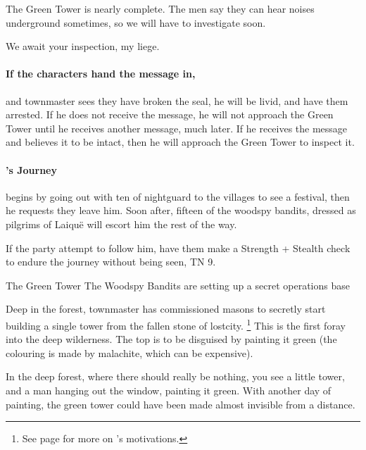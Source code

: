 \begin{multicols}{2}
\begin{speechtext}
	The Green Tower is nearly complete.
	The men say they can hear noises underground sometimes, so we will have to investigate soon.

	We await your inspection, my liege.

\end{speechtext}

\paragraph{If the characters hand the message in,}
and \gls{townmaster} sees they have broken the seal, he will be livid, and have them arrested.
If he does not receive the message, he will not approach the Green Tower until he receives another message, much later.
If he receives the message and believes it to be intact, then he will approach the Green Tower to inspect it.

\paragraph{'s Journey}
begins by going out with ten of \gls{nightguard} to the villages to see a festival, then he requests they leave him.
Soon after, fifteen of the woodspy bandits, dressed as pilgrims of Laiqu\"e will escort him the rest of the way.

If the party attempt to follow him, have them make a Strength + Stealth check to endure the journey without being seen, TN 9.


{The Green Tower}%
{The Woodspy Bandits are setting up a secret operations base}%

Deep in the forest, \gls{townmaster} has commissioned masons to secretly start building a single tower from the fallen stone of \gls{lostcity}.
\footnote{See page \pageref{expanding_wilderness} for more on 's motivations.}
This is the first foray into the deep wilderness.
The top is to be disguised by painting it green (the colouring is made by malachite, which can be expensive).

\begin{boxtext}

	In the deep forest, where there should really be nothing, you see a little tower, and a man hanging out the window, painting it green.
	With another day of painting, the green tower could have been made almost invisible from a distance.


\end{boxtext}
\end{multicols}
